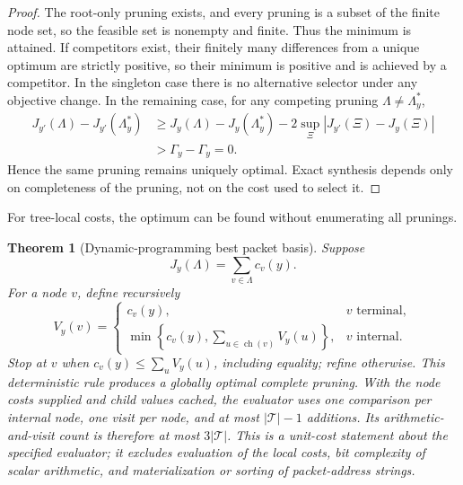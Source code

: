 \documentclass[11pt]{article}
\newtheorem{theorem}{Theorem}[section]
\theoremstyle{definition}
\theoremstyle{remark}
\begin{document}
\begin{proof}
The root-only pruning exists, and every pruning is a subset of the finite node set, so the feasible set is nonempty and finite. Thus the minimum is attained. If competitors exist, their finitely many differences from a unique optimum are strictly positive, so their minimum is positive and is achieved by a competitor. In the singleton case there is no alternative selector under any objective change. In the remaining case, for any competing pruning $\Lambda\ne\Lambda_y^*$,
\[
\begin{aligned}
J_{y'}(\Lambda)-J_{y'}(\Lambda_y^*)
&\ge
J_y(\Lambda)-J_y(\Lambda_y^*)
-2\sup_{\Xi}|J_{y'}(\Xi)-J_y(\Xi)|\\
&>\Gamma_y-\Gamma_y=0.
\end{aligned}
\]
Hence the same pruning remains uniquely optimal.  Exact synthesis depends only on completeness of the pruning, not on the cost used to select it.
\end{proof}

For tree-local costs, the optimum can be found without enumerating all prunings.

\begin{theorem}[Dynamic-programming best packet basis]\label{result:15}
Suppose
\[
J_y(\Lambda)=\sum_{v\in\Lambda}c_v(y).
\]
For a node $v$, define recursively
\[
V_y(v)
=
\begin{cases}
c_v(y),&v\text{ terminal},\\[2mm]
\displaystyle
\min\left\{c_v(y),\sum_{u\in\operatorname{ch}(v)}V_y(u)\right\},
&v\text{ internal}.
\end{cases}
\]
Stop at $v$ when $c_v(y)\le\sum_uV_y(u)$, including equality; refine otherwise. This deterministic rule produces a globally optimal complete pruning. With the node costs supplied and child values cached, the evaluator uses one comparison per internal node, one visit per node, and at most $|\mathcal T|-1$ additions. Its arithmetic-and-visit count is therefore at most $3|\mathcal T|$. This is a unit-cost statement about the specified evaluator; it excludes evaluation of the local costs, bit complexity of scalar arithmetic, and materialization or sorting of packet-address strings.
\end{theorem}
\end{document}
